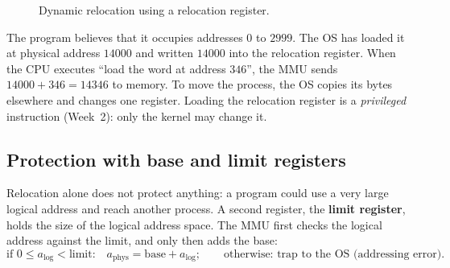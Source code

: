 \documentclass[11pt,a4paper]{article}
\newcommand{\term}[1]{\textbf{\color{mintdeep}#1}}
\begin{document}
\begin{figure}[H]
\centering
{}
\caption{Dynamic relocation using a relocation register.}
\end{figure}

The program believes that it occupies addresses $0$ to $2999$. The OS has loaded it at physical address $14000$ and written $14000$ into the relocation register. When the CPU executes ``load the word at address $346$'', the MMU sends $14000 + 346 = 14346$ to memory. To move the process, the OS copies its bytes elsewhere and changes one register. Loading the relocation register is a \emph{privileged} instruction (Week~2): only the kernel may change it.

\subsection{Protection with base and limit registers}

Relocation alone does not protect anything: a program could use a very large logical address and reach another process. A second register, the \term{limit register}, holds the size of the logical address space. The MMU first checks the logical address against the limit, and only then adds the base:
\[
\text{if } 0 \le a_{\text{log}} < \text{limit:}\quad a_{\text{phys}} = \text{base} + a_{\text{log}};
\qquad \text{otherwise: trap to the OS (addressing error).}
\]
\end{document}
